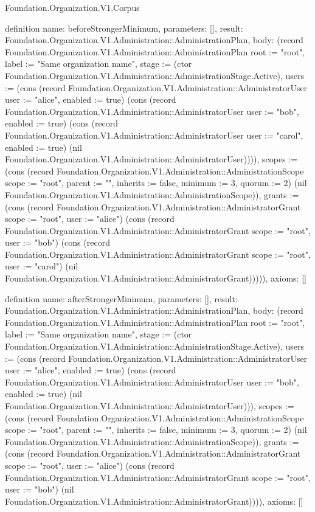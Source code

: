\begin{lexlean}{Foundation.Organization.V1.Corpus}
\begin{semanticmodule}
definition{
  name: beforeStrongerMinimum,
  parameters: [],
  result: Foundation.Organization.V1.Administration::AdministrationPlan,
  body: (record Foundation.Organization.V1.Administration::AdministrationPlan {root := "root", label := "Same organization name", stage := (ctor Foundation.Organization.V1.Administration::AdministrationStage.Active), users := (cons (record Foundation.Organization.V1.Administration::AdministratorUser {user := "alice", enabled := true}) (cons (record Foundation.Organization.V1.Administration::AdministratorUser {user := "bob", enabled := true}) (cons (record Foundation.Organization.V1.Administration::AdministratorUser {user := "carol", enabled := true}) (nil Foundation.Organization.V1.Administration::AdministratorUser)))), scopes := (cons (record Foundation.Organization.V1.Administration::AdministrationScope {scope := "root", parent := "", inherits := false, minimum := 3, quorum := 2}) (nil Foundation.Organization.V1.Administration::AdministrationScope)), grants := (cons (record Foundation.Organization.V1.Administration::AdministratorGrant {scope := "root", user := "alice"}) (cons (record Foundation.Organization.V1.Administration::AdministratorGrant {scope := "root", user := "bob"}) (cons (record Foundation.Organization.V1.Administration::AdministratorGrant {scope := "root", user := "carol"}) (nil Foundation.Organization.V1.Administration::AdministratorGrant))))}),
  axioms: []
}

definition{
  name: afterStrongerMinimum,
  parameters: [],
  result: Foundation.Organization.V1.Administration::AdministrationPlan,
  body: (record Foundation.Organization.V1.Administration::AdministrationPlan {root := "root", label := "Same organization name", stage := (ctor Foundation.Organization.V1.Administration::AdministrationStage.Active), users := (cons (record Foundation.Organization.V1.Administration::AdministratorUser {user := "alice", enabled := true}) (cons (record Foundation.Organization.V1.Administration::AdministratorUser {user := "bob", enabled := true}) (nil Foundation.Organization.V1.Administration::AdministratorUser))), scopes := (cons (record Foundation.Organization.V1.Administration::AdministrationScope {scope := "root", parent := "", inherits := false, minimum := 3, quorum := 2}) (nil Foundation.Organization.V1.Administration::AdministrationScope)), grants := (cons (record Foundation.Organization.V1.Administration::AdministratorGrant {scope := "root", user := "alice"}) (cons (record Foundation.Organization.V1.Administration::AdministratorGrant {scope := "root", user := "bob"}) (nil Foundation.Organization.V1.Administration::AdministratorGrant)))}),
  axioms: []
}


\end{semanticmodule}
\end{lexlean}
